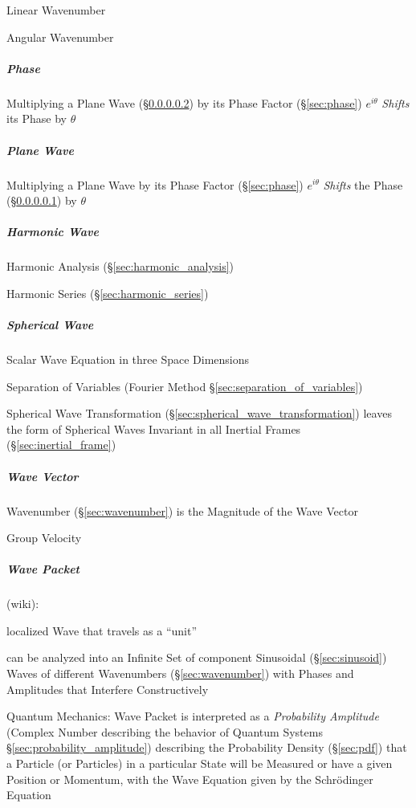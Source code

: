 Linear Wavenumber

Angular Wavenumber



\subparagraph{Phase}\label{sec:wave_phase}\hfill

Multiplying a Plane Wave (\S\ref{sec:plane_wave}) by its Phase Factor
(\S\ref{sec:phase}) $e^{i\theta}$ \emph{Shifts} its Phase by $\theta$



\subparagraph{Plane Wave}\label{sec:plane_wave}\hfill

Multiplying a Plane Wave by its Phase Factor (\S\ref{sec:phase}) $e^{i\theta}$
\emph{Shifts} the Phase (\S\ref{sec:wave_phase}) by $\theta$



\subparagraph{Harmonic Wave}\label{sec:harmonic_wave}\hfill

\fist Harmonic Analysis (\S\ref{sec:harmonic_analysis})

\fist Harmonic Series (\S\ref{sec:harmonic_series})



\subparagraph{Spherical Wave}\label{sec:spherical_wave}\hfill

Scalar Wave Equation in three Space Dimensions

Separation of Variables (Fourier Method \S\ref{sec:separation_of_variables})

Spherical Wave Transformation (\S\ref{sec:spherical_wave_transformation})
leaves the form of Spherical Waves Invariant in all Inertial Frames
(\S\ref{sec:inertial_frame})



\subparagraph{Wave Vector}\label{sec:wave_vector}\hfill

Wavenumber (\S\ref{sec:wavenumber}) is the Magnitude of the Wave Vector

Group Velocity



\subparagraph{Wave Packet}\label{sec:wave_packet}\hfill

(wiki):

localized Wave that travels as a ``unit''

can be analyzed into an Infinite Set of component Sinusoidal
(\S\ref{sec:sinusoid}) Waves of different Wavenumbers (\S\ref{sec:wavenumber})
with Phases and Amplitudes that Interfere Constructively

Quantum Mechanics: Wave Packet is interpreted as a \emph{Probability Amplitude}
(Complex Number describing the behavior of Quantum Systems
\S\ref{sec:probability_amplitude}) describing the Probability Density
(\S\ref{sec:pdf}) that a Particle (or Particles) in a particular State will be
Measured or have a given Position or Momentum, with the Wave Equation given by
the Schr\"odinger Equation



